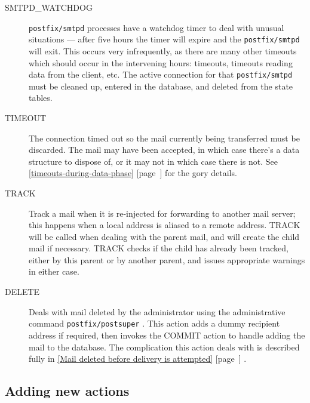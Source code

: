 \documentclass[a4paper,12pt,draft]{article}
\newcommand{\refwithpage}[1]{%
    \empty{}\ref{#1} [page~\pageref{#1}]%
}
\newcommand{\sectionref}[1]{%
    \textsection{}\refwithpage{#1}%
}
\newcommand{\daemon}[1]{%
    \texttt{postfix/#1}%
}
\newcounter{dummy}
\begin{document}
\begin{description}
    \item [SMTPD\_WATCHDOG] \daemon{smtpd} processes have a watchdog timer
        to deal with unusual situations --- after five hours the timer will
        expire and the \daemon{smtpd} will exit.  This occurs very
        infrequently, as there are many other timeouts which should occur
        in the intervening hours: \DNS{} timeouts, timeouts reading data
        from the client, etc.  The active connection for that
        \daemon{smtpd} must be cleaned up, entered in the database, and
        deleted from the state tables.

    \item [TIMEOUT] The connection timed out so the mail currently being
        transferred must be discarded. The mail may have been accepted, in
        which case there's a data structure to dispose of, or it may not in
        which case there is not.  See
        \sectionref{timeouts-during-data-phase} for the gory details.

    \item [TRACK] Track a mail when it is re-injected for forwarding to
        another mail server; this happens when a local address is aliased
        to a remote address.  TRACK will be called when dealing with the
        parent mail, and will create the child mail if necessary. TRACK
        checks if the child has already been tracked, either by this parent
        or by another parent, and issues appropriate warnings in either
        case.

    \item [DELETE] Deals with mail deleted by the administrator using the
        administrative command \daemon{postsuper}.  This action adds a
        dummy recipient address if required, then invokes the COMMIT action
        to handle adding the mail to the database.  The complication this
        action deals with is described fully in \sectionref{Mail deleted
        before delivery is attempted}.  

\end{description}

\subsection{Adding new actions}

\label{adding new actions}
\end{document}

